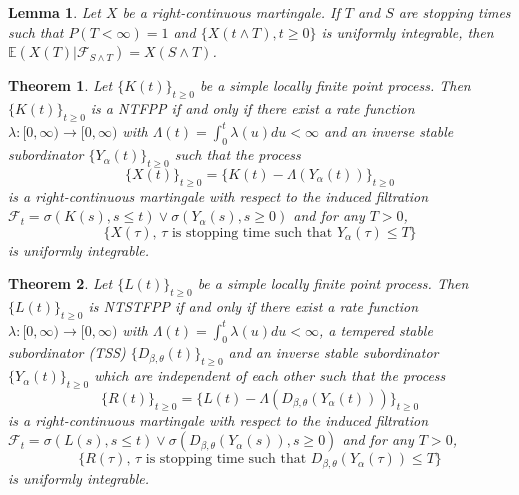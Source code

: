 \documentclass[10pt,a4paper]{amsart}
\newtheorem{theorem}{Theorem}
\newtheorem{lemma}{Lemma}
\begin{document}
\begin{lemma}\label{martingale_lemma}
    Let $X$ be a right-continuous martingale. If $T$ and $S$ are stopping times such that $P(T<\infty)=1$ and $\{X(t\wedge T),t\ge 0\}$ is uniformly integrable, then $\mathbb{E}(X(T)|\mathcal{F}_{S\wedge T})=X(S\wedge T)$.
\end{lemma}

\begin{theorem}\label{Watanabe_characterization_NFPP}
    Let $\{K(t)\}_{t\ge 0}$ be a simple locally finite point process. Then $\{K(t)\}_{t\ge 0}$ is a NTFPP if and only if there exist a rate function $\lambda:[0,\infty)\to[0,\infty)$ with $\Lambda(t)=\int_{0}^{t}\lambda(u)du<\infty$ and an inverse stable subordinator $\{Y_{\alpha}(t)\}_{t\ge 0}$ such that the process 
    \begin{equation}\label{martingale_form_nfpp}
    \{X(t)\}_{t\ge 0}=\{K(t)-\Lambda(Y_{\alpha}(t))\}_{t\ge 0}    
    \end{equation} 
    is a right-continuous martingale with respect to the induced filtration $\mathcal{F}_t=\sigma\left(K(s),s\le t\right)\vee\sigma\left(Y_{\alpha}(s), s\ge 0\right)$ and for any $T>0$,
    \begin{equation}\label{stopping_times_martingale_nfpp}
        \{X(\tau),\,\tau\,\, \text{is stopping time such that}\,\,Y_{\alpha}(\tau)\le T\}
    \end{equation}
    is uniformly integrable.
\end{theorem}

\begin{theorem}\label{Watanabe_characterization_NTSTFPP}
    Let $\{L(t)\}_{t\ge 0}$ be a simple locally finite point process. Then $\{L(t)\}_{t\ge 0}$ is NTSTFPP if and only if there exist a rate function $\lambda:[0,\infty)\to[0,\infty)$ with $\Lambda(t)=\int_{0}^{t}\lambda(u)du<\infty$, a tempered stable subordinator (TSS) $\{D_{\beta,\theta}(t)\}_{t\ge 0}$ and an inverse stable subordinator $\{Y_\alpha(t)\}_{t\ge 0}$ which are independent of each other such that the process 
    \begin{equation*}\label{martingale_form_NTSTFPP}
    \{R(t)\}_{t\ge 0}=\{L(t)-\Lambda(D_{\beta,\theta}(Y_{\alpha}(t)))\}_{t\ge 0}    
    \end{equation*} 
    is a right-continuous martingale with respect to the induced filtration $\mathcal{F}_t=\sigma\left(L(s),s\le t\right)\vee\sigma\left(D_{\beta,\theta}(Y_{\alpha}(s)), s\ge 0\right)$ and for any $T>0$,
    \begin{equation*}\label{stopping_times_martingale_NTSTFPP}
        \{R(\tau),\,\tau\,\, \text{is stopping time such that}\,\,D_{\beta,\theta}(Y_{\alpha}(\tau))\le T\}
    \end{equation*}
    is uniformly integrable.
\end{theorem}
\end{document}

